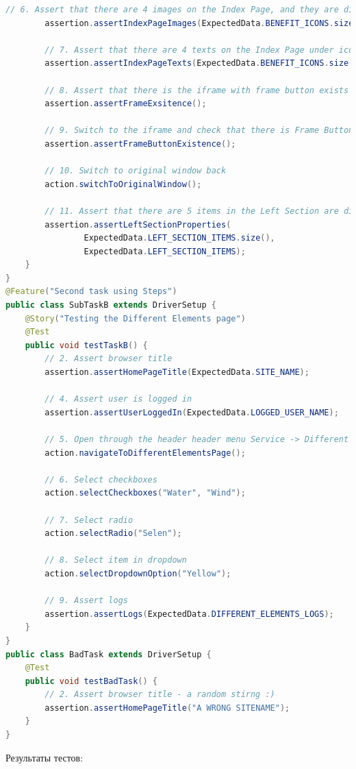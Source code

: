\documentclass[a4paper]{article}
\begin{document}
\begin{lstlisting}[language=Java]
        // 6. Assert that there are 4 images on the Index Page, and they are displayed
        assertion.assertIndexPageImages(ExpectedData.BENEFIT_ICONS.size());

        // 7. Assert that there are 4 texts on the Index Page under icons, and they have proper text
        assertion.assertIndexPageTexts(ExpectedData.BENEFIT_ICONS.size(), ExpectedData.BENEFIT_ICONS);

        // 8. Assert that there is the iframe with frame button exists
        assertion.assertFrameExsitence();

        // 9. Switch to the iframe and check that there is Frame Button in the iframe
        assertion.assertFrameButtonExistence();

        // 10. Switch to original window back
        action.switchToOriginalWindow();

        // 11. Assert that there are 5 items in the Left Section are displayed, and they have proper text
        assertion.assertLeftSectionProperties(
                ExpectedData.LEFT_SECTION_ITEMS.size(),
                ExpectedData.LEFT_SECTION_ITEMS);
    }
}
@Feature("Second task using Steps")
public class SubTaskB extends DriverSetup {
    @Story("Testing the Different Elements page")
    @Test
    public void testTaskB() {
        // 2. Assert browser title
        assertion.assertHomePageTitle(ExpectedData.SITE_NAME);

        // 4. Assert user is logged in
        assertion.assertUserLoggedIn(ExpectedData.LOGGED_USER_NAME);

        // 5. Open through the header header menu Service -> Different Elements Page
        action.navigateToDifferentElementsPage();

        // 6. Select checkboxes
        action.selectCheckboxes("Water", "Wind");

        // 7. Select radio
        action.selectRadio("Selen");

        // 8. Select item in dropdown
        action.selectDropdownOption("Yellow");

        // 9. Assert logs
        assertion.assertLogs(ExpectedData.DIFFERENT_ELEMENTS_LOGS);
    }
}
public class BadTask extends DriverSetup {
    @Test
    public void testBadTask() {
        // 2. Assert browser title - a random stirng :)
        assertion.assertHomePageTitle("A WRONG SITENAME");
    }
}\end{lstlisting}
    Результаты тестов:
\end{document}
